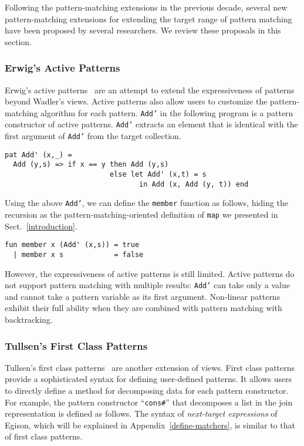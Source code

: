 \documentclass{article}
\begin{document}
Following the pattern-matching extensions in the previous decade, several new pattern-matching extensions for extending the target range of pattern matching have been proposed by several researchers.
We review these proposals in this section.

\subsubsection{Erwig's Active Patterns}

Erwig's active patterns~\cite{erwig1996active}  are an attempt to extend the expressiveness of patterns beyond Wadler's views.
Active patterns also allow users to customize the pattern-matching algorithm for each pattern.
\texttt{Add'} in the following program is a pattern constructor of active patterns.
\texttt{Add'} extracts an element that is identical with the first argument of \texttt{Add'} from the target collection.

\begin{lstlisting}[language=egison]
pat Add' (x,_) =
  Add (y,s) => if x == y then Add (y,s)
                         else let Add' (x,t) = s
                                in Add (x, Add (y, t)) end
\end{lstlisting}

Using the above \texttt{Add'}, we can define the \texttt{member} function as follows, hiding the recursion as the pattern-matching-oriented definition of \texttt{map} we presented in Sect.~\ref{introduction}.

\begin{lstlisting}[language=egison]
fun member x (Add' (x,s)) = true
  | member x s            = false
\end{lstlisting}

However, the expressiveness of active patterns is still limited.
Active patterns do not support pattern matching with multiple results: \texttt{Add'} can take only a value and cannot take a pattern variable as its first argument.
Non-linear patterns exhibit their full ability when they are combined with pattern matching with backtracking.

\subsubsection{Tullsen's First Class Patterns}

Tullsen's first class patterns~\cite{tullsen2000first} are another extension of views.
First class patterns provide a sophisticated syntax for defining user-defined patterns.
It allows users to directly define a method for decomposing data for each pattern constructor.
For example, the pattern constructor ``\verb|cons#|'' that decomposes a list in the join representation is defined as follows.
The syntax of \emph{next-target expressions} of Egison, which will be explained in Appendix~\ref{define-matchers}, is similar to that of first class patterns.
\end{document}
